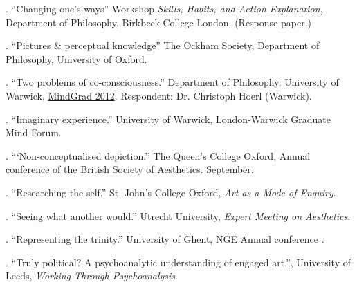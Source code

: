 \documentclass[11pt]{article}
\begin{document}
\bigskip

\medskip
{}. ``Changing one's ways'' Workshop \emph{Skills, Habits, and Action Explanation}, Department of Philosophy, Birkbeck College London. (Response paper.)

. ``Pictures \& perceptual knowledge'' The Ockham Society, Department of Philosophy, University of Oxford.

. ``Two problems of co-consciousness.'' Department of Philosophy, University of Warwick, \href{http://www2.warwick.ac.uk/fac/soc/philosophy/news/conferences/mindgrad-2012/}{MindGrad 2012}. Respondent: Dr. Christoph Hoerl (Warwick).

. ``Imaginary experience.'' University of Warwick, London-Warwick Graduate Mind Forum.


. ```Non-conceptualised depiction.'' The Queen's College Oxford, Annual conference of the British Society of Aesthetics. September.

. ``Researching the self.'' St. John's College Oxford, \emph{Art as a Mode of Enquiry}.

. ``Seeing what another would.'' Utrecht University, \emph{Expert Meeting on Aesthetics}.

. ``Representing the trinity.'' University of Ghent, NGE Annual conference .

. ``Truly political? A psychoanalytic understanding of engaged art.'', University of Leeds, \emph{Working Through Psychoanalysis}.

% 

\bigskip

% 
% 
% 
% 
\end{document}
